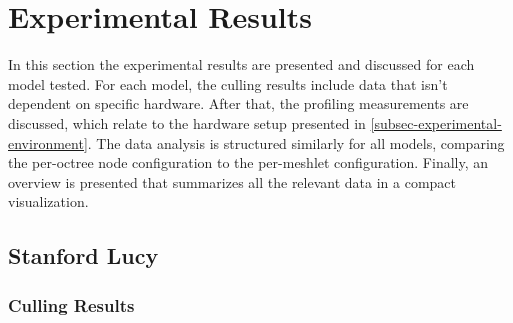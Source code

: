\section{Experimental Results}

In this section the experimental results are presented and discussed for each model tested.
For each model, the culling results include data that isn't dependent on specific hardware. 
After that, the profiling measurements are discussed, which relate to the hardware setup presented 
in \ref{subsec-experimental-environment}. The data analysis is structured similarly for all models,
comparing the per-octree node configuration to the per-meshlet configuration. Finally, an overview 
is presented that summarizes all the relevant data in a compact visualization.


\subsection*{Stanford Lucy}

\subsubsection*{Culling Results} \label{subsubsec-culling-results-lucy}


